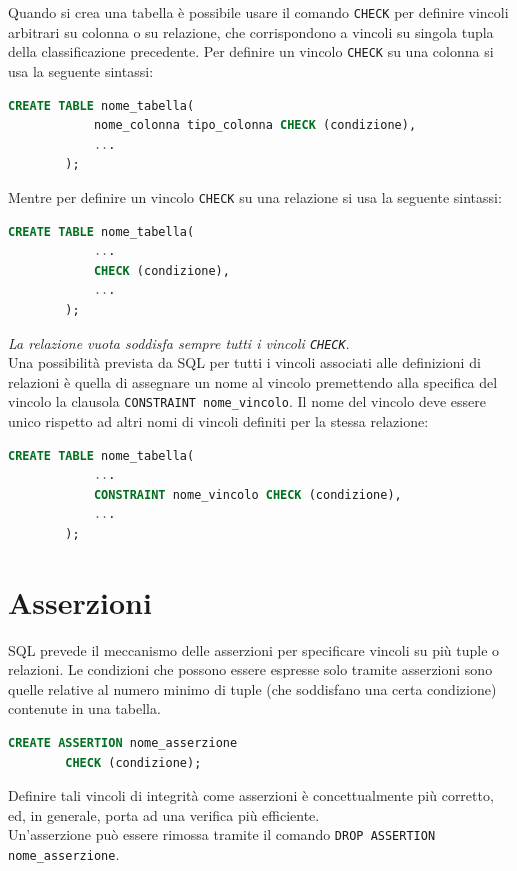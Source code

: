 \documentclass[12pt, a4paper]{report}
\begin{document}
    Quando si crea una tabella è possibile usare il comando \texttt{CHECK} per definire vincoli arbitrari su colonna o su relazione, che corrispondono a vincoli su singola tupla della classificazione precedente. Per definire un vincolo \texttt{CHECK} su una colonna si usa la seguente sintassi:
    \begin{lstlisting}[language=SQL]
        CREATE TABLE nome_tabella(
            nome_colonna tipo_colonna CHECK (condizione),
            ...
        );
    \end{lstlisting}
    Mentre per definire un vincolo \texttt{CHECK} su una relazione si usa la seguente sintassi:
    \begin{lstlisting}[language=SQL]
        CREATE TABLE nome_tabella(
            ...
            CHECK (condizione),
            ...
        );
    \end{lstlisting}
    \textit{La relazione vuota soddisfa sempre tutti i vincoli \texttt{CHECK}}.\\
    Una possibilità prevista da SQL per tutti i vincoli associati alle definizioni di relazioni è quella di assegnare un nome al vincolo premettendo alla specifica del vincolo la clausola \texttt{CONSTRAINT nome\_vincolo}. Il nome del vincolo deve essere unico rispetto ad altri nomi di vincoli definiti per la stessa relazione:
    \begin{lstlisting}[language=SQL]
        CREATE TABLE nome_tabella(
            ...
            CONSTRAINT nome_vincolo CHECK (condizione),
            ...
        );
    \end{lstlisting}
    \section{Asserzioni}
    SQL prevede il meccanismo delle asserzioni per specificare vincoli su più tuple o relazioni. Le condizioni che possono essere espresse solo tramite asserzioni sono quelle relative al numero minimo di tuple (che soddisfano una certa condizione) contenute in una tabella.
    \begin{lstlisting}[language=SQL]
        CREATE ASSERTION nome_asserzione
        CHECK (condizione);
    \end{lstlisting}
    Definire tali vincoli di integrità come asserzioni è concettualmente più corretto, ed, in generale, porta ad una verifica più efficiente.\\
    Un'asserzione può essere rimossa tramite il comando \texttt{DROP ASSERTION nome\_asserzione}.
\end{document}
